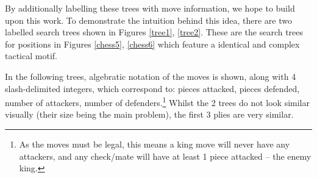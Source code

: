 By additionally labelling these trees with move information, we hope to build
upon this work. To demonstrate the intuition behind this idea, there are two
labelled search trees shown in Figures \ref{tree1}, \ref{tree2}. These are the
search trees for positions in Figures \ref{chess5}, \ref{chess6} which feature
a identical and complex tactical motif. 

In the following trees, algebratic notation of the moves is shown, along with 4
slash-delimited integers, which correspond to: pieces attacked, pieces
defended, number of attackers, number of defenders.\footnote{As the moves must
be legal, this means a king move will never have any attackers, and any
check/mate will have at least 1 piece attacked -- the enemy king.} Whilst the 2
trees do not look similar visually (their size being the main problem), the
first 3 plies are very similar. 

